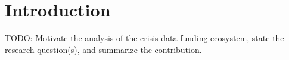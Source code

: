 \section{Introduction}
\label{sec:introduction}

TODO: Motivate the analysis of the crisis data funding ecosystem, state the research
question(s), and summarize the contribution.
